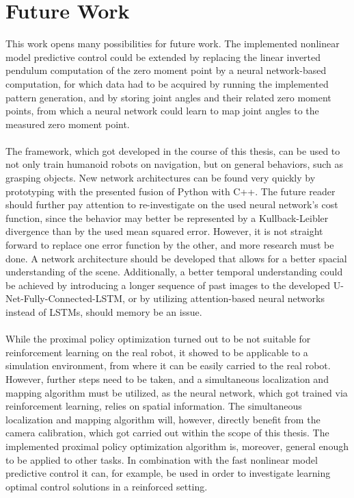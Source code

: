 \section{Future Work}
This work opens many possibilities for future work. The implemented nonlinear model predictive control could be extended by replacing the linear inverted pendulum computation of the zero moment point by a neural network-based computation, for which data had to be acquired by running the implemented pattern generation, and by storing joint angles and their related zero moment points, from which a neural network could learn to map joint angles to the measured zero moment point.\\\\
The framework, which got developed in the course of this thesis, can be used to not only train humanoid robots on navigation, but on general behaviors, such as grasping objects. New network architectures can be found very quickly by prototyping with the presented fusion of Python with C++. The future reader should further pay attention to re-investigate on the used neural network's cost function, since the behavior may better be represented by a Kullback-Leibler divergence than by the used mean squared error. However, it is not straight forward to replace one error function by the other, and more research must be done. A network architecture should be developed that allows for a better spacial understanding of the scene. Additionally, a better temporal understanding could be achieved by introducing a longer sequence of past images to the developed U-Net-Fully-Connected-LSTM, or by utilizing attention-based neural networks instead of LSTMs, should memory be an issue. \\\\
While the proximal policy optimization turned out to be not suitable for reinforcement learning on the real robot, it showed to be applicable to a simulation environment, from where it can be easily carried to the real robot. However, further steps need to be taken, and a simultaneous localization and mapping algorithm must be utilized, as the neural network, which got trained via reinforcement learning, relies on spatial information. The simultaneous localization and mapping algorithm will, however, directly benefit from the camera calibration, which got carried out within the scope of this thesis. The implemented proximal policy optimization algorithm is, moreover, general enough to be applied to other tasks. In combination with the fast nonlinear model predictive control it can, for example, be used in order to investigate learning optimal control solutions in a reinforced setting.